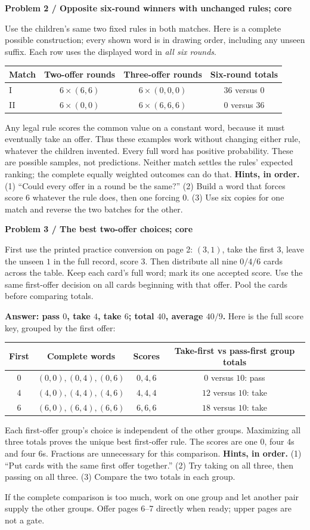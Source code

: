 \documentclass[11pt,letterpaper]{article}
\newcommand{\task}[2]{\par\textbf{Problem #1 / #2}\par}
\newcommand{\hint}[1]{\textbf{Hints, in order.} #1\par}
\newcommand{\word}[1]{\ensuremath{(#1)}}
\begin{document}
\task{2}{Opposite six-round winners with unchanged rules; core}
Use the children's same two fixed rules in both matches. Here is a complete
possible construction; every shown word is in drawing order, including any
unseen suffix. Each row uses the displayed word in \emph{all six rounds}.
\begin{center}
\begin{tabular}{@{}lccc@{}}\toprule
Match & Two-offer rounds & Three-offer rounds & Six-round totals \\\midrule
I & $6\times\word{6,6}$ & $6\times\word{0,0,0}$ & $36$ versus $0$ \\
II & $6\times\word{0,0}$ & $6\times\word{6,6,6}$ & $0$ versus $36$ \\\bottomrule
\end{tabular}\end{center}
Any legal rule scores the common value on a constant word, because it must
eventually take an offer. Thus these examples work without changing either
rule, whatever the children invented. Every full word has positive probability.
These are possible samples, not predictions. Neither match settles the rules'
expected ranking; the complete equally weighted outcomes can do that.
\hint{(1) ``Could every offer in a round be the same?''
(2) Build a word that forces score $6$ whatever the rule does, then one forcing
$0$. (3) Use six copies for one match and reverse the two batches for the other.}

\task{3}{The best two-offer choices; core}
First use the printed practice conversion on page 2: $\word{3,1}$, take the
first $3$, leave the unseen $1$ in the full record, score $3$.
Then distribute all nine $0/4/6$ cards across the table. Keep each card's full
word; mark its one accepted score. Use the same first-offer decision on all
cards beginning with that offer. Pool the cards before comparing totals.

\textbf{Answer: pass $0$, take $4$, take $6$; total $40$, average $40/9$.}
Here is the full score key, grouped by the first offer:
\begin{center}\small
\begin{tabular}{@{}cccc@{}}\toprule
First & Complete words & Scores & Take-first vs pass-first group totals \\\midrule
$0$ & $(0,0),(0,4),(0,6)$ & $0,4,6$ & $0$ versus $10$: pass \\
$4$ & $(4,0),(4,4),(4,6)$ & $4,4,4$ & $12$ versus $10$: take \\
$6$ & $(6,0),(6,4),(6,6)$ & $6,6,6$ & $18$ versus $10$: take \\\bottomrule
\end{tabular}\end{center}
Each first-offer group's choice is independent of the other groups. Maximizing
all three totals proves the unique best first-offer rule. The scores are one
$0$, four $4$s and four $6$s. Fractions are unnecessary for this comparison.
\hint{(1) ``Put cards with the same first offer together.''
(2) Try taking on all three, then passing on all three.
(3) Compare the two totals in each group.}
If the complete comparison is too much, work on one group and let another
pair supply the other groups. Offer pages 6--7 directly when ready; upper pages
are not a gate.
\end{document}
